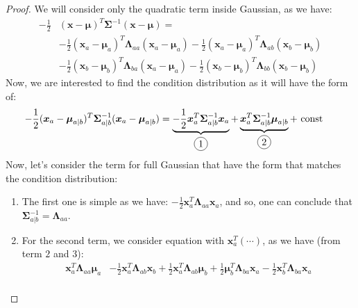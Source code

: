 \begin{proof}
    We will consider only the quadratic term inside Gaussian, as we have:
    \begin{equation*}
    \begin{aligned}
        -\frac{1}{2}&(\boldsymbol x-\boldsymbol \mu)^T\boldsymbol \Sigma^{-1}(\boldsymbol x-\boldsymbol \mu) =\\ 
        &-\frac{1}{2}(\boldsymbol x_a-\boldsymbol \mu_a)^T\boldsymbol \Lambda_{aa}(\boldsymbol x_a - \boldsymbol \mu_a) - \frac{1}{2}(\boldsymbol x_a-\boldsymbol \mu_a)^T\boldsymbol \Lambda_{ab}(\boldsymbol x_b - \boldsymbol \mu_b) \\
        &-\frac{1}{2}(\boldsymbol x_b-\boldsymbol \mu_b)^T\boldsymbol \Lambda_{ba}(\boldsymbol x_a - \boldsymbol \mu_a) - \frac{1}{2}(\boldsymbol x_b-\boldsymbol \mu_b)^T\boldsymbol \Lambda_{bb}(\boldsymbol x_b - \boldsymbol \mu_b)
    \end{aligned}
    \end{equation*}
    Now, we are interested to find the condition distribution as it will have the form of:
    \begin{equation*}
    \begin{aligned}
        -\frac{1}{2}&(\boldsymbol x_{a} - \boldsymbol \mu_{a|b})^T\boldsymbol \Sigma_{a|b}^{-1}(\boldsymbol x_a - \boldsymbol \mu_{a|b}) = \underbrace{-\frac{1}{2}\boldsymbol x_a^T\boldsymbol \Sigma_{a|b}^{-1}\boldsymbol x_a}_{\circled{1}} + \underbrace{\boldsymbol x_a^T\boldsymbol \Sigma_{a|b}^{-1}\boldsymbol \mu_{a|b}}_{\circled{2}} + \text{ const }
    \end{aligned}
    \end{equation*}
    Now, let's consider the term for full Gaussian that have the form that matches the condition distribution:
    \begin{enumerate}
        \item The first one is simple as we have: $-\frac{1}{2}\boldsymbol x_a^T\boldsymbol \Lambda_{aa}\boldsymbol x_a$, and so, one can conclude that $\boldsymbol \Sigma_{a|b}^{-1} = \boldsymbol \Lambda_{aa}$.
        \item For the second term, we consider equation with $\boldsymbol x_a^T(\cdots)$, as we have (from term $2$ and $3$):
        \begin{equation*}
        \begin{aligned}
            \boldsymbol x_a^T\boldsymbol \Lambda_{aa}\boldsymbol \mu_a &- \frac{1}{2}\boldsymbol x_a^T\boldsymbol \Lambda_{ab}\boldsymbol x_b + \frac{1}{2} \boldsymbol x_a^T\boldsymbol \Lambda_{ab}\boldsymbol \mu_b + \frac{1}{2}\boldsymbol \mu_b^T\boldsymbol \Lambda_{ba}\boldsymbol x_a - \frac{1}{2}\boldsymbol x_b^T\boldsymbol \Lambda_{ba}\boldsymbol x_a\\

\end{aligned}
\end{equation*}
\end{enumerate}
\end{proof}
